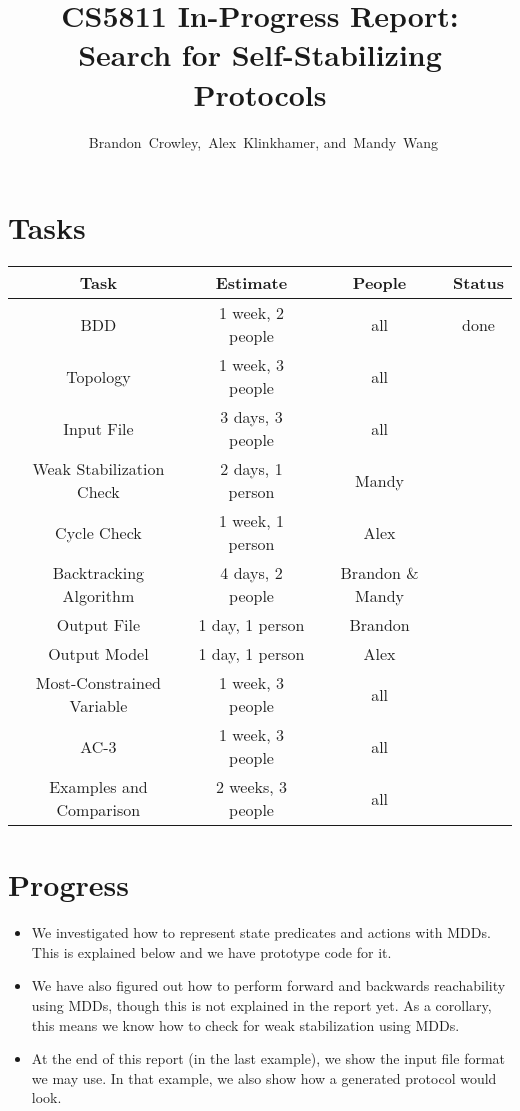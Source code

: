 


\usepackage{tikz}
\usetikzlibrary{arrows}
\usepackage{listings}



\title{
 CS5811 In-Progress Report:\\
 Search for Self-Stabilizing Protocols
}

\author{~Brandon~Crowley,~Alex~Klinkhamer, and~Mandy~Wang}
\maketitle




\section{Tasks}

\begin{center}
\begin{tabular}{|c||c|c|c|}
\hline
 Task & Estimate & People & Status \\
\hline
 BDD & 1 week, 2 people & all & done \\
 Topology & 1 week, 3 people & all & \\
 Input File & 3 days, 3 people & all & \\
 Weak Stabilization Check & 2 days, 1 person & Mandy & \\
 Cycle Check & 1 week, 1 person & Alex & \\
 Backtracking Algorithm & 4 days, 2 people & Brandon \& Mandy & \\
 Output File & 1 day, 1 person &  Brandon & \\
 Output Model & 1 day, 1 person & Alex & \\
 Most-Constrained Variable & 1 week, 3 people & all & \\
 AC-3 & 1 week, 3 people & all & \\
 Examples and Comparison & 2 weeks, 3 people & all & \\
\hline
\end{tabular}
\end{center}

\section{Progress}

\begin{itemize}
 \item We investigated how to represent state predicates and actions with MDDs.
  This is explained below and we have prototype code for it.
 \item We have also figured out how to perform forward and backwards reachability using MDDs, though this is not explained in the report yet.
  As a corollary, this means we know how to check for weak stabilization using MDDs.
 \item At the end of this report (in the last example), we show the input file format we may use.
  In that example, we also show how a generated protocol would look.
\end{itemize}

